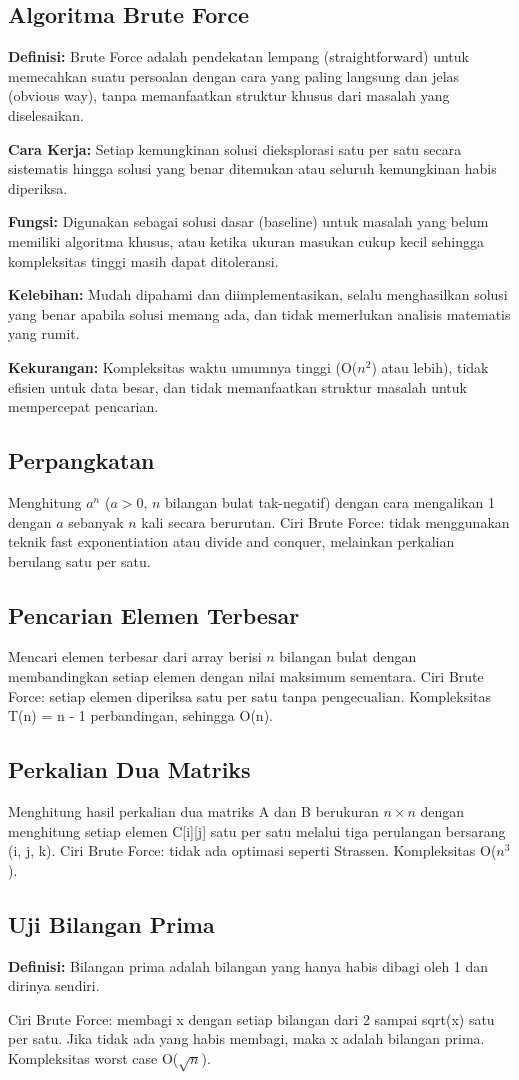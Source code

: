 \subsection{Algoritma Brute Force}
\textbf{Definisi:} Brute Force adalah pendekatan lempang (straightforward) untuk memecahkan suatu persoalan dengan cara yang paling langsung dan jelas (obvious way), tanpa memanfaatkan struktur khusus dari masalah yang diselesaikan.

\textbf{Cara Kerja:} Setiap kemungkinan solusi dieksplorasi satu per satu secara sistematis hingga solusi yang benar ditemukan atau seluruh kemungkinan habis diperiksa.

\textbf{Fungsi:} Digunakan sebagai solusi dasar (baseline) untuk masalah yang belum memiliki algoritma khusus, atau ketika ukuran masukan cukup kecil sehingga kompleksitas tinggi masih dapat ditoleransi.

\textbf{Kelebihan:} Mudah dipahami dan diimplementasikan, selalu menghasilkan solusi yang benar apabila solusi memang ada, dan tidak memerlukan analisis matematis yang rumit.

\textbf{Kekurangan:} Kompleksitas waktu umumnya tinggi (O($n^2$) atau lebih), tidak efisien untuk data besar, dan tidak memanfaatkan struktur masalah untuk mempercepat pencarian.

\subsection{Perpangkatan}
Menghitung $a^n$ ($a > 0$, $n$ bilangan bulat tak-negatif) dengan cara mengalikan 1 dengan $a$ sebanyak $n$ kali secara berurutan. Ciri Brute Force: tidak menggunakan teknik fast exponentiation atau divide and conquer, melainkan perkalian berulang satu per satu.

\subsection{Pencarian Elemen Terbesar}
Mencari elemen terbesar dari array berisi $n$ bilangan bulat dengan membandingkan setiap elemen dengan nilai maksimum sementara. Ciri Brute Force: setiap elemen diperiksa satu per satu tanpa pengecualian. Kompleksitas T(n) = n - 1 perbandingan, sehingga O(n).

\subsection{Perkalian Dua Matriks}
Menghitung hasil perkalian dua matriks A dan B berukuran $n \times n$ dengan menghitung setiap elemen C[i][j] satu per satu melalui tiga perulangan bersarang (i, j, k). Ciri Brute Force: tidak ada optimasi seperti Strassen. Kompleksitas O($n^3$).

\subsection{Uji Bilangan Prima}
\textbf{Definisi:} Bilangan prima adalah bilangan yang hanya habis dibagi oleh 1 dan dirinya sendiri.

Ciri Brute Force: membagi x dengan setiap bilangan dari 2 sampai sqrt(x) satu per satu. Jika tidak ada yang habis membagi, maka x adalah bilangan prima. Kompleksitas worst case O($\sqrt{n}$).